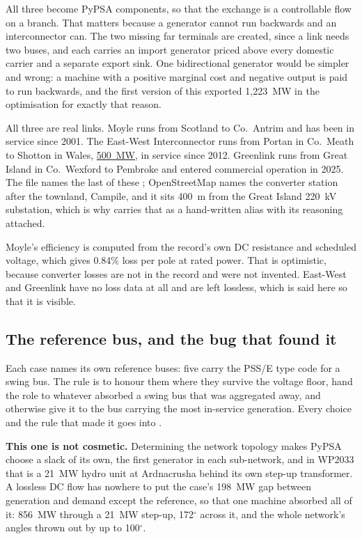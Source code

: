 \documentclass[11pt,a4paper]{article}
\begin{document}
All three become PyPSA  components, so that the exchange is a
controllable flow on a branch. That matters because a generator cannot run
backwards and an interconnector can. The two missing far
terminals are created, since a link needs two buses, and each carries an import
generator priced above every domestic carrier and a separate export sink. One
bidirectional generator would be simpler and wrong: a machine with a positive
marginal cost and negative output is paid to run backwards, and the first
version of this exported 1{,}223~MW in the optimisation for exactly that
reason.

All three are real links. Moyle runs from Scotland to Co.\ Antrim and has been
in service since 2001. The East-West Interconnector runs from Portan in
Co.\ Meath to Shotton in Wales, \href{https://www.eirgrid.ie/industry/interconnection}{500~MW}, in service since 2012. Greenlink runs
from Great Island in Co.\ Wexford to Pembroke and entered commercial operation
in 2025. The file names the last of these
; OpenStreetMap names the converter station after the townland,
Campile, and it sits 400~m from the Great Island 220~kV substation, which is
why  carries that as a hand-written alias with its reasoning
attached.

Moyle's efficiency is computed from the record's own DC resistance and
scheduled voltage, which gives 0.84\% loss per pole at rated power. That is
optimistic, because converter losses are not in the record and were not
invented. East-West and Greenlink have no loss data at all and are left
lossless, which is said here so that it is visible.


\subsection{The reference bus, and the bug that found it}
\label{sec:slack}

Each case names its own reference buses: five carry the PSS/E type code for a
swing bus. The rule is to honour them where they survive the voltage floor,
hand the role to whatever absorbed a swing bus that was aggregated away, and
otherwise give it to the bus carrying the most in-service generation. Every
choice and the rule that made it goes into .

\textbf{This one is not cosmetic.} Determining the network topology makes PyPSA
choose a slack of its own, the first generator in each sub-network, and in
WP2033 that is a 21~MW hydro unit at Ardnacrusha behind its own step-up
transformer. A lossless DC flow has nowhere to put the case's 198~MW gap
between generation and demand except the reference, so that one machine
absorbed all of it: 856~MW through a 21~MW step-up, 172$^\circ$ across it, and
the whole network's angles thrown out by up to 100$^\circ$.
\end{document}
